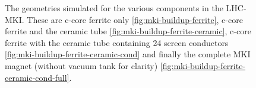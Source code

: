 \begin{figure}
\caption{The geometries simulated for the various components in the LHC-MKI. These are c-core ferrite only \ref{fig:mki-buildup-ferrite}, c-core ferrite and the ceramic tube \ref{fig:mki-buildup-ferrite-ceramic}, c-core ferrite with the ceramic tube containing 24 screen conductors \ref{fig:mki-buildup-ferrite-ceramic-cond} and finally the complete MKI magnet (without vacuum tank for clarity) \ref{fig:mki-buildup-ferrite-ceramic-cond-full}.}
\label{fig:mki-layout-buildup}
\end{figure}

